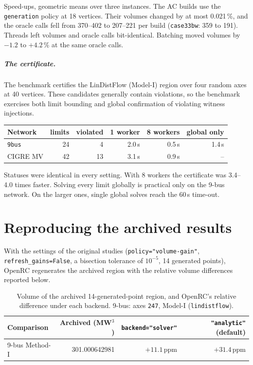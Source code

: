 \documentclass[11pt,a4paper]{report}
\newcommand{\code}[1]{\texttt{\small #1}}
\begin{document}
\noindent Speed-ups, geometric means over three instances. The AC builds use
the \code{generation} policy at 18 vertices. Their volumes changed by at most
0.021\,\%, and the oracle calls fell from 370--402 to 207--221 per build
(\code{case33bw}: 359 to 191). Threads left volumes and oracle calls
bit-identical. Batching moved volumes by $-1.2$ to $+4.2\,\%$ at the same
oracle calls.

\paragraph{The certificate.} The benchmark certifies the LinDistFlow (Model-I)
region over four random axes at 40 vertices. These candidates generally contain
violations, so the benchmark exercises both limit bounding and global
confirmation of violating witness injections.
\begin{center}\footnotesize
\begin{tabular}{@{}lrrrrr@{}}
\toprule
Network & limits & violated & 1 worker & 8 workers & global only \\
\midrule
\code{9bus}     & 24  & 4  & 2.0\,s   & 0.5\,s  & 1.4\,s \\
CIGRE MV        & 42  & 13 & 3.1\,s   & 0.9\,s  & --     \\
\bottomrule
\end{tabular}
\end{center}
\noindent Statuses were identical in every setting. With 8 workers the
certificate was 3.4--4.0 times faster. Solving every
limit globally is practical only on the 9-bus network. On the larger ones,
single global solves reach the 60\,s time-out.

\chapter{Reproducing the archived results}
\label{ch:evidence}

With the settings of the original studies (\code{policy="volume-gain"},
\code{refresh\_gains=False}, a bisection tolerance of $10^{-5}$, 14 generated
points), OpenRC regenerates the archived region with the relative volume
differences reported below.

\begin{table}[h]
\centering\small
\caption{Volume of the archived 14-generated-point region, and OpenRC's
relative difference under each backend. 9-bus: axes \code{247}, Model-I
(\code{lindistflow}).}
\begin{tabular}{@{}lrrr@{}}
\toprule
Comparison & Archived (MW$^3$) & \code{backend="solver"} & \code{"analytic"} (default) \\
\midrule
9-bus Method-I  & 301.000642981 & $+11.1$\,ppm & $+31.4$\,ppm \\
\bottomrule
\end{tabular}
\end{table}
\end{document}
